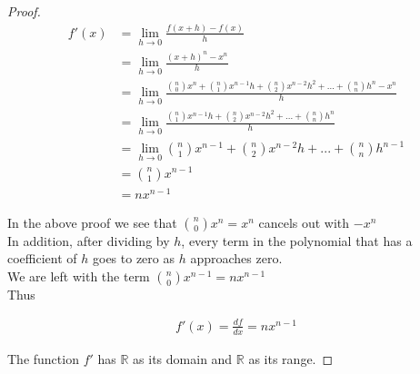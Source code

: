 \documentclass{article}
\begin{document}
\begin{proof}
\begin{align*}
f'(x) &= \lim_{h \to 0} \frac{\displaystyle f(x+h) - f(x)}{\displaystyle h} \\
&= \lim_{h \to 0} \frac{\displaystyle (x+h)^n - x^n}{\displaystyle h} \\
&= \lim_{h \to 0} \frac{\displaystyle \binom{n}{0} x^{n} + \binom{n}{1} x^{n-1} h + \binom{n}{2} x^{n-2} h^2 + ... + \binom{n}{n} h^n - x^n}{\displaystyle h} \\
&= \lim_{h \to 0} \frac{\displaystyle \binom{n}{1} x^{n-1} h + \binom{n}{2} x^{n-2} h^2 + ... + \binom{n}{n} h^n}{\displaystyle h} \\
&= \lim_{h \to 0} \binom{n}{1} x^{n-1} + \binom{n}{2} x^{n-2} h + ... + \binom{n}{n} h^{n-1} \\
&= \binom{n}{1} x^{n-1} \\
&= nx^{n-1}
\end{align*}

In the above proof we see that $\displaystyle \binom{n}{0} x^{n} = x^{n}$ cancels out with $-x^{n}$ \\

In addition, after dividing by $h$, every term in the polynomial that has a coefficient of $h$ goes to zero as $h$ approaches zero. \\

We are left with the term $\displaystyle \binom{n}{0} x^{n-1} = nx^{n-1}$ \\

Thus 

\begin{align*}
f'(x) = \frac{df}{dx} = nx^{n-1}
\end{align*}

The function $f'$ has $\mathbb{R}$ as its domain and $\mathbb{R}$ as its range.

\end{proof}
\end{document}
